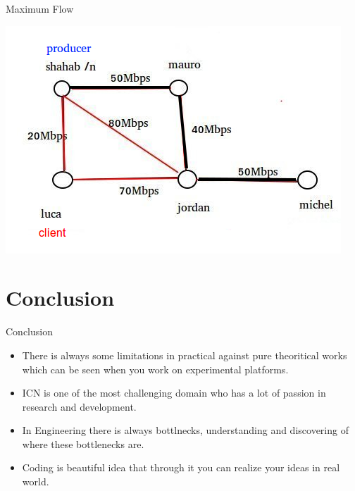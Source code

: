 \documentclass[8pt]{beamer}
\newcommand{\1}{\mathbbm 1}
\begin{document}
\begin{frame}{Maximum Flow}
{\begin{center}
\includegraphics[scale=0.32]{figures/MaxFlow2.png} 
\end{center}



}




\end{frame}

\section{Conclusion}

\begin{frame}{Conclusion}
\begin{itemize}
 
\item There is always some limitations in practical against pure theoritical works which can be seen when you work on experimental platforms.
\item ICN is one of the most challenging domain who has a lot of passion in research and development.
\item In Engineering there is always bottlnecks, understanding and discovering of where these bottlenecks are.

\item Coding is beautiful idea that through it you can realize your ideas in real world.
\end{itemize}

\end{frame}

\end{document}
